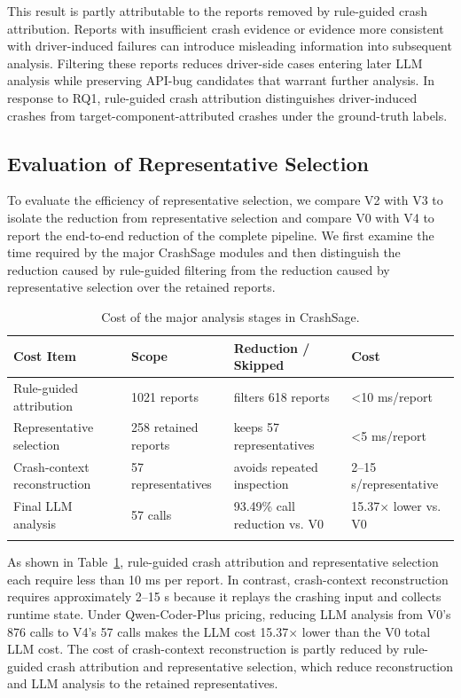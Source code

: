 \documentclass[pdflatex,sn-basic]{sn-jnl}%
\renewcommand{\arraystretch}{1.16}%
\theoremstyle{thmstyleone}%
\theoremstyle{thmstyletwo}%
\theoremstyle{thmstylethree}%
\begin{document}
This result is partly attributable to the reports removed by rule-guided crash attribution. Reports with insufficient crash evidence or evidence more consistent with driver-induced failures can introduce misleading information into subsequent analysis. Filtering these reports reduces driver-side cases entering later LLM analysis while preserving API-bug candidates that warrant further analysis. In response to RQ1, rule-guided crash attribution distinguishes driver-induced crashes from target-component-attributed crashes under the ground-truth labels.

\subsection{Evaluation of Representative Selection}

To evaluate the efficiency of representative selection, we compare V2 with V3 to isolate the reduction from representative selection and compare V0 with V4 to report the end-to-end reduction of the complete pipeline. We first examine the time required by the major CrashSage modules and then distinguish the reduction caused by rule-guided filtering from the reduction caused by representative selection over the retained reports.

\begin{table}[ht]
\caption{Cost of the major analysis stages in CrashSage.}
\label{tab:stage-latency}
\centering
\fontsize{6.3pt}{7.2pt}\selectfont
\setlength{\tabcolsep}{2.0pt}
\renewcommand{\arraystretch}{1.12}
\begin{tabular*}{\linewidth}{@{\extracolsep{\fill}}llll}
\toprule
\textbf{Cost Item} & \textbf{Scope} & \textbf{Reduction / Skipped} & \textbf{Cost} \\
\midrule
Rule-guided attribution & 1021 reports & filters 618 reports & \textless{}10 ms/report \\
Representative selection & 258 retained reports & keeps 57 representatives & \textless{}5 ms/report \\
Crash-context reconstruction & 57 representatives & avoids repeated inspection & 2--15 s/representative \\
Final LLM analysis & 57 calls & 93.49\% call reduction vs. V0 & 15.37$\times$ lower vs. V0 \\
\botrule
\end{tabular*}
\end{table}

As shown in Table~\ref{tab:stage-latency}, rule-guided crash attribution and representative selection each require less than 10 ms per report. In contrast, crash-context reconstruction requires approximately 2--15 s because it replays the crashing input and collects runtime state. Under Qwen-Coder-Plus pricing, reducing LLM analysis from V0's 876 calls to V4's 57 calls makes the LLM cost 15.37$\times$ lower than the V0 total LLM cost. The cost of crash-context reconstruction is partly reduced by rule-guided crash attribution and representative selection, which reduce reconstruction and LLM analysis to the retained representatives.
\end{document}
